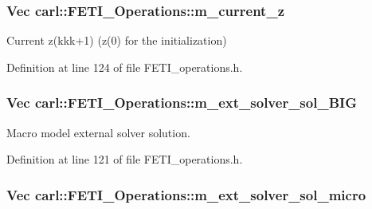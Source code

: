 \subsubsection[{m\+\_\+current\+\_\+z}]{\setlength{\rightskip}{0pt plus 5cm}Vec carl\+::\+F\+E\+T\+I\+\_\+\+Operations\+::m\+\_\+current\+\_\+z\hspace{0.3cm}{\ttfamily [protected]}}\label{classcarl_1_1_f_e_t_i___operations_a56038a186d124078ad4b37c631f50ff0}


Current {\ttfamily z(kkk+1)} ({\ttfamily z(0)} for the initialization) 



Definition at line 124 of file F\+E\+T\+I\+\_\+operations.\+h.

\hypertarget{classcarl_1_1_f_e_t_i___operations_a2dc346bc628b1639c0aaa9f3b0c5852d}{}
\subsubsection[{m\+\_\+ext\+\_\+solver\+\_\+sol\+\_\+\+B\+I\+G}]{\setlength{\rightskip}{0pt plus 5cm}Vec carl\+::\+F\+E\+T\+I\+\_\+\+Operations\+::m\+\_\+ext\+\_\+solver\+\_\+sol\+\_\+\+B\+I\+G\hspace{0.3cm}{\ttfamily [protected]}}\label{classcarl_1_1_f_e_t_i___operations_a2dc346bc628b1639c0aaa9f3b0c5852d}


Macro model external solver solution. 



Definition at line 121 of file F\+E\+T\+I\+\_\+operations.\+h.

\hypertarget{classcarl_1_1_f_e_t_i___operations_a4e2a843baafa4a006fe429c2c82c466f}{}
\subsubsection[{m\+\_\+ext\+\_\+solver\+\_\+sol\+\_\+micro}]{\setlength{\rightskip}{0pt plus 5cm}Vec carl\+::\+F\+E\+T\+I\+\_\+\+Operations\+::m\+\_\+ext\+\_\+solver\+\_\+sol\+\_\+micro\hspace{0.3cm}{\ttfamily [protected]}}\label{classcarl_1_1_f_e_t_i___operations_a4e2a843baafa4a006fe429c2c82c466f}



